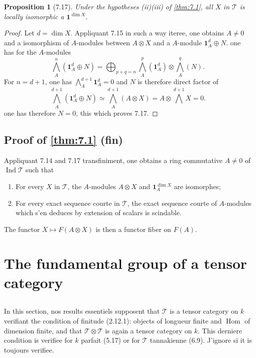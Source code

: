 \documentclass[12pt,a4paper]{article}
\theoremstyle{plain}
\newtheorem{proposition}[theorem]{Proposition}
\theoremstyle{definition}
\DeclareMathOperator{\Hom}{Hom}
\DeclareMathOperator{\Ind}{Ind}
\begin{document}
\begin{proposition}[7.17]
Under the hypotheses \textup{(ii)(iii)} of \ref{thm:7.1}, all $X$ in $\mathcal{T}$ is locally isomorphic a $\mathbf{1}^{\dim X}$.
\end{proposition}

\begin{proof}
Let $d = \dim X$. Appliquant 7.15 in such a way iteree, one obtains $A \neq 0$ and a isomorphism of $A$-modules between $A \otimes X$ and a $A$-module $\mathbf{1}_A^d \oplus N$. one has for the $A$-modules
\[
\bigwedge^n_A(\mathbf{1}_A^d \oplus N) = \bigoplus_{p+q=n} \bigwedge^p_A(\mathbf{1}_A^d) \otimes \bigwedge^q_A(N).
\]
For $n = d+1$, one has $\bigwedge^{d+1}_A \mathbf{1}_A^d = 0$ and $N$ is therefore direct factor of
\[
\bigwedge^{d+1}_A(\mathbf{1}_A^d \oplus N) \simeq \bigwedge^{d+1}_A(A \otimes X) = A \otimes \bigwedge^{d+1} X = 0.
\]
one has therefore $N = 0$, this which proves 7.17.
\end{proof}

\subsection{Proof of \ref{thm:7.1} (fin)}

Appliquant 7.14 and 7.17 transfiniment, one obtains a ring commutative $A \neq 0$ of $\Ind\mathcal{T}$ such that
\begin{enumerate}
\item[(7.19.1)] For every $X$ in $\mathcal{T}$, the $A$-modules $A \otimes X$ and $\mathbf{1}_A^{\dim X}$ are isomorphes;
\item[(7.19.2)] For every exact sequence courte in $\mathcal{T}$, the exact sequence courte of $A$-modules which s'en deduces by extension of scalars is scindable.
\end{enumerate}

The functor $X \mapsto F(A \otimes X)$ is then a functor fiber on $F(A)$.

\section{The fundamental group of a tensor category}

\subsection{}

In this section, nos results essentiels supposent that $\mathcal{T}$ is a tensor category on $k$ verifiant the condition of finitude (2.12.1): objects of longueur finite and $\Hom$ of dimension finite, and that $\mathcal{T} \otimes \mathcal{T}$ is again a tensor category on $k$. This derniere condition is verifiee for $k$ parfait (5.17) or for $\mathcal{T}$ tannakienne (6.9). J'ignore si it is toujours verifiee.
\end{document}

